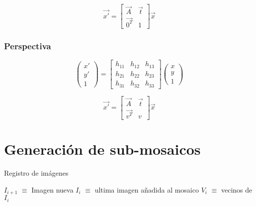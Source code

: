 \begin{equation}
\vec{x'}= 
\begin{bmatrix}
{\vec{A}}&{\vec{t}}\\
{\vec{0^T}}&{1}
\end{bmatrix}
\vec{x}
\label{bloque-afin}
\end{equation}

\subsubsection*{Perspectiva}

\begin{equation}
\begin{pmatrix}
{x'}\\{y'}\\{1}
\end{pmatrix} = 
\begin{bmatrix}
{h_{11}}&{h_{12}}&{h_{13}}\\
{h_{21}}&{h_{22}}&{h_{23}}\\
{h_{31}}&{h_{32}}&{h_{33}}
\end{bmatrix}
\begin{pmatrix}
{x}\\{y}\\{1}
\end{pmatrix}
\label{matriz-perspectiva}
\end{equation}

\begin{equation}
\vec{x'}= 
\begin{bmatrix}
{\vec{A}}&{\vec{t}}\\
{\vec{v^T}}&{v}
\end{bmatrix}
\vec{x}
\label{bloque-perspectiva}
\end{equation}


\section{Generación de sub-mosaicos}

\begin{algorithm}[H] %
	\caption{Registro de imágenes}
	\SetAlgoLined
	$I_{i+1}$ $\equiv$ Imagen nueva\;
	$I_{i}$ $\equiv$ ultima imagen añadida al mosaico\;
	$V_{i}$ $\equiv$ vecinos de $I_{i}$\;
\end{algorithm}


